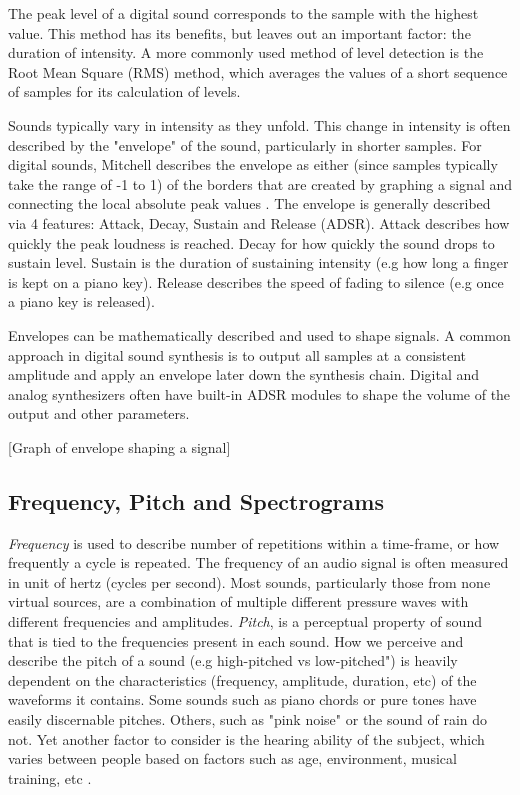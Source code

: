 \documentclass[\main/thesis.tex]{subfiles}
\begin{document}
The peak level of a digital sound corresponds to the sample with the highest value. This method has its benefits, but leaves out an important factor: the duration of intensity. A more commonly used method of level detection is the Root Mean Square (RMS) method, which averages the values of a short sequence of samples for its calculation of levels.

Sounds typically vary in intensity as they unfold. This change in intensity is often described by the "envelope" of the sound, particularly in shorter samples. For digital sounds, Mitchell describes the envelope as either (since samples typically take the range of -1 to 1) of the borders that are created by graphing a signal and connecting the local absolute peak values \cite{mitchell2009basicsynthChap6}. The envelope is generally described via 4 features: Attack, Decay, Sustain and Release (ADSR). Attack describes how quickly the peak loudness is reached. Decay for how quickly the sound drops to sustain level. Sustain is the duration of sustaining intensity (e.g how long a finger is kept on a piano key). Release describes the speed of fading to silence (e.g once a piano key is released).

Envelopes can be mathematically described and used to shape signals. A common approach in digital sound synthesis is to output all samples at a consistent amplitude and apply an envelope later down the synthesis chain. Digital and analog synthesizers often have built-in ADSR modules to shape the volume of the output and other parameters.  

[Graph of envelope shaping a signal]
\subsection{Frequency, Pitch and Spectrograms}
\textit{Frequency} is used to describe number of repetitions within a time-frame, or how frequently a cycle is repeated. The frequency of an audio signal is often measured in unit of hertz (cycles per second). Most sounds, particularly those from none virtual sources, are a combination of multiple different pressure waves with different frequencies and amplitudes. \textit{Pitch}, is a perceptual property of sound that is tied to the frequencies present in each sound. How we perceive and describe the pitch of a sound (e.g high-pitched vs low-pitched") is heavily dependent on the characteristics (frequency, amplitude, duration, etc) of the waveforms it contains. Some sounds such as piano chords or pure tones have easily discernable pitches. Others, such as "pink noise" or the sound of rain do not. Yet another factor to consider is the hearing ability of the subject, which varies between people based on factors such as age, environment, musical training, etc \cite{reiss2016meta,alain2007age,newman2012grm7}. 
\end{document}
